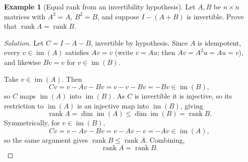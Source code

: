 \documentclass[11pt]{article}
\theoremstyle{definition}
\newtheorem{example}{Example}[section]
\newcommand{\rank}{\operatorname{rank}}
\begin{document}
\begin{example}[Equal rank from an invertibility hypothesis]
Let $A,B$ be $n\times n$ matrices with $A^2=A$, $B^2=B$, and suppose $I-(A+B)$ is invertible. Prove that $\rank A=\rank B$.
\end{example}

\begin{proof}[Solution]
Let $C=I-A-B$, invertible by hypothesis. Since $A$ is idempotent, every $v\in\operatorname{im}(A)$ satisfies $Av=v$ (write $v=Au$; then $Av=A^2u=Au=v$), and likewise $Bv=v$ for $v\in\operatorname{im}(B)$.

Take $v\in\operatorname{im}(A)$. Then
\[
Cv=v-Av-Bv=v-v-Bv=-Bv\in\operatorname{im}(B),
\]
so $C$ maps $\operatorname{im}(A)$ into $\operatorname{im}(B)$. As $C$ is invertible it is injective, so its restriction to $\operatorname{im}(A)$ is an injective map into $\operatorname{im}(B)$, giving
\[
\rank A=\dim\operatorname{im}(A)\le \dim\operatorname{im}(B)=\rank B.
\]
Symmetrically, for $v\in\operatorname{im}(B)$,
\[
Cv=v-Av-Bv=v-Av-v=-Av\in\operatorname{im}(A),
\]
so the same argument gives $\rank B\le\rank A$. Combining,
\[
\boxed{\rank A=\rank B}.
\]
\end{proof}
\end{document}
